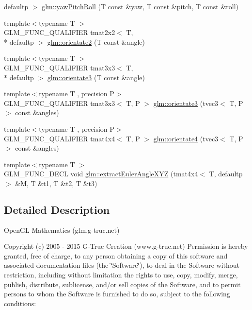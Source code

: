 \begin{DoxyCompactItemize}
defaultp $>$ \hyperlink{group__gtx__euler__angles_gaf9c8d0f1df88c5344165600774489bc5}{glm\-::yaw\-Pitch\-Roll} (T const \&yaw, T const \&pitch, T const \&roll)
\item 
{\footnotesize template$<$typename T $>$ }\\G\-L\-M\-\_\-\-F\-U\-N\-C\-\_\-\-Q\-U\-A\-L\-I\-F\-I\-E\-R tmat2x2$<$ T, \\*
defaultp $>$ \hyperlink{group__gtx__euler__angles_ga6f465681cbbc575ad93a53ec918dacf3}{glm\-::orientate2} (T const \&angle)
\item 
{\footnotesize template$<$typename T $>$ }\\G\-L\-M\-\_\-\-F\-U\-N\-C\-\_\-\-Q\-U\-A\-L\-I\-F\-I\-E\-R tmat3x3$<$ T, \\*
defaultp $>$ \hyperlink{group__gtx__euler__angles_gab188e2526dea3c003e86e298f618085e}{glm\-::orientate3} (T const \&angle)
\item 
{\footnotesize template$<$typename T , precision P$>$ }\\G\-L\-M\-\_\-\-F\-U\-N\-C\-\_\-\-Q\-U\-A\-L\-I\-F\-I\-E\-R tmat3x3$<$ T, P $>$ \hyperlink{group__gtx__euler__angles_ga33f0d790cecd8337ee83f8e3a8109b11}{glm\-::orientate3} (tvec3$<$ T, P $>$ const \&angles)
\item 
{\footnotesize template$<$typename T , precision P$>$ }\\G\-L\-M\-\_\-\-F\-U\-N\-C\-\_\-\-Q\-U\-A\-L\-I\-F\-I\-E\-R tmat4x4$<$ T, P $>$ \hyperlink{group__gtx__euler__angles_ga4e25c9468b6f002c76e9a2412bcfa503}{glm\-::orientate4} (tvec3$<$ T, P $>$ const \&angles)
\item 
{\footnotesize template$<$typename T $>$ }\\G\-L\-M\-\_\-\-F\-U\-N\-C\-\_\-\-D\-E\-C\-L void \hyperlink{group__gtx__euler__angles_ga77ab6440250bd8b7e87a06c5643d6e74}{glm\-::extract\-Euler\-Angle\-X\-Y\-Z} (tmat4x4$<$ T, defaultp $>$ \&M, T \&t1, T \&t2, T \&t3)
\end{DoxyCompactItemize}


\subsection{Detailed Description}
Open\-G\-L Mathematics (glm.\-g-\/truc.\-net)

Copyright (c) 2005 -\/ 2015 G-\/\-Truc Creation (www.\-g-\/truc.\-net) Permission is hereby granted, free of charge, to any person obtaining a copy of this software and associated documentation files (the \char`\"{}\-Software\char`\"{}), to deal in the Software without restriction, including without limitation the rights to use, copy, modify, merge, publish, distribute, sublicense, and/or sell copies of the Software, and to permit persons to whom the Software is furnished to do so, subject to the following conditions\-:

